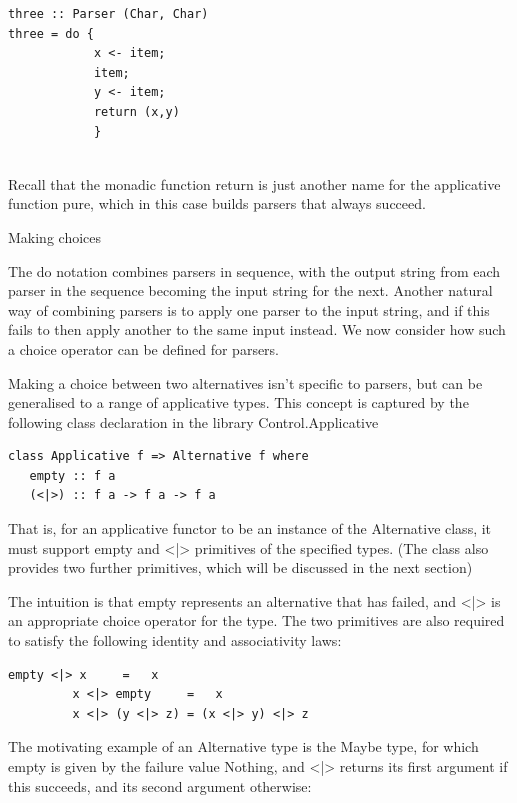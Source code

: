 \documentclass[a4papert]{article}
\begin{document}
\begin{lstlisting}[style=haskellstyle]
three :: Parser (Char, Char)
three = do {
            x <- item;
            item;
            y <- item;
            return (x,y)
            }


\end{lstlisting}
Recall that the monadic function return is just another name for the applicative function pure, which in this case builds parsers that always succeed.


Making choices

The do notation combines parsers in sequence, with the output string from each parser in the sequence becoming the input string for the next. Another natural way of combining parsers is to apply one parser to the input string, and if this fails to then apply another to the same input instead. We now consider how such a choice operator can be defined for parsers.

Making a choice between two alternatives isn't specific to parsers, but can be generalised to a range of applicative types. This concept is captured by the following class declaration in the library Control.Applicative


\begin{lstlisting}[style=haskellstyle]
class Applicative f => Alternative f where
   empty :: f a
   (<|>) :: f a -> f a -> f a
\end{lstlisting}




That is, for an applicative functor to be an instance of the Alternative class, it must support empty and <|> primitives of the specified types. (The class also provides two further primitives, which will be discussed in the next section)


The intuition is that empty represents an alternative that has failed, and <|> is an appropriate choice operator for the type. The two primitives are also required to satisfy the following identity and associativity laws:

\begin{lstlisting}[style=haskellstyle]
         empty <|> x     =   x
         x <|> empty     =   x
         x <|> (y <|> z) = (x <|> y) <|> z
\end{lstlisting}


The motivating example of an Alternative type is the Maybe type, for which empty is given by the failure value Nothing, and <|> returns its first argument if this succeeds, and its second argument otherwise:
\end{document}
